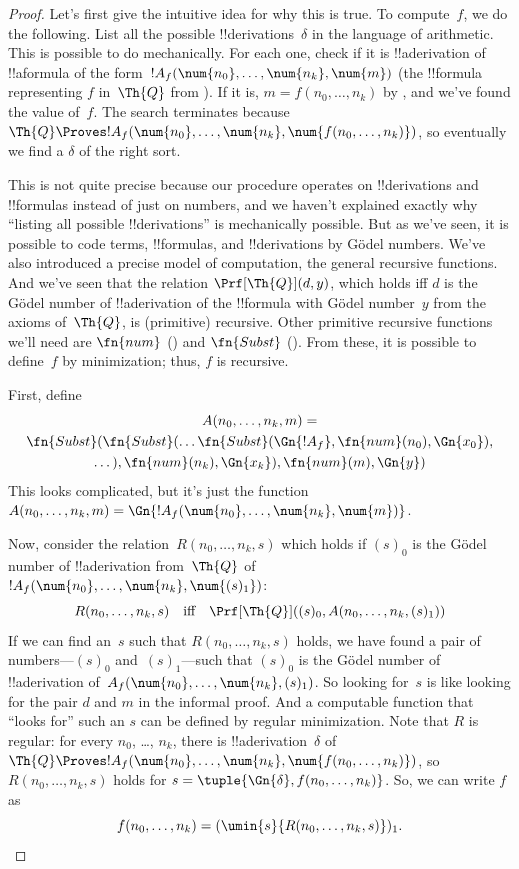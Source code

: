 \documentclass[../../../include/open-logic-section]{subfiles}
\begin{document}
\begin{proof}
Let's first give the intuitive idea for why this is true. To
compute~$f$, we do the following.  List all the possible
!!{derivation}s~$\delta$ in the language of arithmetic. This is
possible to do mechanically. For each one, check if it is
!!a{derivation} of !!a{formula} of the form~$!A_f(\num{n_0}, \dots,
\num{n_k}, \num{m})$ (the !!{formula} representing $f$ in~$\Th{Q}$
from ). If it is, $m = f(n_0, \dots, n_k)$ by
, and we've found the value of~$f$. The search
terminates because $\Th{Q} \Proves !A_f(\num{n_0}, \dots, \num{n_k},
\num{f(n_0, \dots, n_k)})$, so eventually we find a $\delta$ of the
right sort.

This is not quite precise because our procedure operates on
!!{derivation}s and !!{formula}s instead of just on numbers, and we
haven't explained exactly why ``listing all possible !!{derivation}s''
is mechanically possible.  But as we've seen, it is possible to code
terms, !!{formula}s, and !!{derivation}s by G\"odel numbers. We've
also introduced a precise model of computation, the general recursive
functions. And we've seen that the relation $\Prf[\Th{Q}](d,y)$, which
holds iff $d$ is the G\"odel number of !!a{derivation} of the !!{formula}
with G\"odel number~$y$ from the axioms of~$\Th{Q}$, is (primitive)
recursive. Other primitive recursive functions we'll need are
$\fn{num}$ () and $\fn{Subst}$
().  From these, it is possible to
define~$f$ by minimization; thus, $f$ is recursive.

First, define
\begin{multline*}
  A(n_0, \dots, n_k, m) = \\
  \fn{Subst}(\fn{Subst}(\dots\fn{Subst}(\Gn{!A_f}, \fn{num}(n_0), \Gn{x_0}),\\ \dots),
  \fn{num}(n_k),  \Gn{x_k}), \fn{num}(m), \Gn{y})
\end{multline*}
This looks complicated, but it's just the function $A(n_0, \dots, n_k,
m) = \Gn{!A_f(\num{n_0}, \dots, \num{n_k}, \num{m})}$.

Now, consider the relation~$R(n_0, \dots, n_k, s)$ which holds if
$(s)_0$ is the G\"odel number of !!a{derivation} from~$\Th{Q}$ of
$!A_f(\num{n_0}, \dots, \num{n_k}, \num{(s)_1})$:
\[
R(n_0, \dots, n_k, s) \quad\text{iff}\quad \Prf[\Th{Q}]((s)_0, A(n_0,
\dots, n_k, (s)_1))
\]
If we can find an~$s$ such that $R(n_0, \dots, n_k, s)$ holds, we have
found a pair of numbers---$(s)_0$ and~$(s)_1$---such that $(s)_0$ is
the G\"odel number of !!a{derivation} of~$A_f(\num{n_0}, \dots,
\num{n_k}, (s)_1)$. So looking for~$s$ is like looking for the pair
$d$ and $m$ in the informal proof. And a computable function that
``looks for'' such an $s$ can be defined by regular minimization.
Note that $R$ is regular: for every $n_0$, \dots, $n_k$, there is
!!a{derivation}~$\delta$ of $\Th{Q} \Proves !A_f(\num{n_0}, \dots,
\num{n_k}, \num{f(n_0, \dots, n_k)})$, so $R(n_0, \dots, n_k, s)$
holds for $s = \tuple{\Gn{\delta}, f(n_0, \dots, n_k)}$.  So, we can
write $f$ as
\[
f(n_0,\dots,n_{k}) = (\umin{s}{R(n_0, \dots, n_k, s)})_1.
\]
\end{proof}
\end{document}
